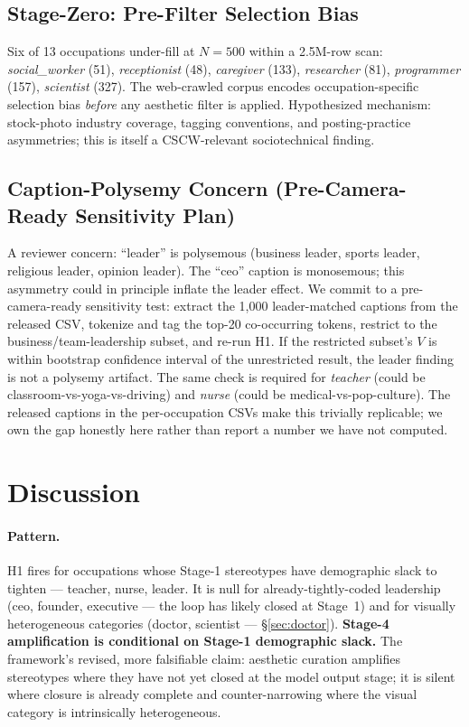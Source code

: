 \documentclass[manuscript, nonacm, screen, review]{acmart}
\begin{document}
\subsection{Stage-Zero: Pre-Filter Selection Bias}

Six of 13 occupations under-fill at $N=500$ within a 2.5M-row scan: \emph{social\_worker} (51), \emph{receptionist} (48), \emph{caregiver} (133), \emph{researcher} (81), \emph{programmer} (157), \emph{scientist} (327). The web-crawled corpus encodes occupation-specific selection bias \emph{before} any aesthetic filter is applied. Hypothesized mechanism: stock-photo industry coverage, tagging conventions, and posting-practice asymmetries; this is itself a CSCW-relevant sociotechnical finding.

\subsection{Caption-Polysemy Concern (Pre-Camera-Ready Sensitivity Plan)}
\label{sec:caption}

A reviewer concern: ``leader'' is polysemous (business leader, sports leader, religious leader, opinion leader). The ``ceo'' caption is monosemous; this asymmetry could in principle inflate the leader effect. We commit to a pre-camera-ready sensitivity test: extract the 1{,}000 leader-matched captions from the released CSV, tokenize and tag the top-20 co-occurring tokens, restrict to the business/team-leadership subset, and re-run H1. If the restricted subset's $V$ is within bootstrap confidence interval of the unrestricted result, the leader finding is not a polysemy artifact. The same check is required for \emph{teacher} (could be classroom-vs-yoga-vs-driving) and \emph{nurse} (could be medical-vs-pop-culture). The released captions in the per-occupation CSVs make this trivially replicable; we own the gap honestly here rather than report a number we have not computed.

\section{Discussion}
\label{sec:discussion}

\paragraph{Pattern.} H1 fires for occupations whose Stage-1 stereotypes have demographic slack to tighten --- teacher, nurse, leader. It is null for already-tightly-coded leadership (ceo, founder, executive --- the loop has likely closed at Stage~1) and for visually heterogeneous categories (doctor, scientist --- §\ref{sec:doctor}). \textbf{Stage-4 amplification is conditional on Stage-1 demographic slack.} The framework's revised, more falsifiable claim: aesthetic curation amplifies stereotypes where they have not yet closed at the model output stage; it is silent where closure is already complete and counter-narrowing where the visual category is intrinsically heterogeneous.
\end{document}
